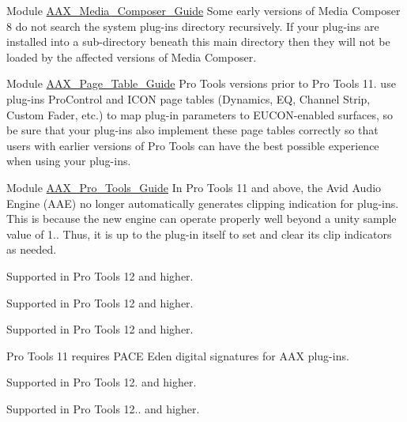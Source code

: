 \begin{DoxyRefList}
\item[Module \mbox{\hyperlink{a00847}{AAX\+\_\+\+Media\+\_\+\+Composer\+\_\+\+Guide}} ]\label{a00801__compatibility_notes000008}%
%
 Some early versions of Media Composer 8 do not search the system plug-\/ins directory recursively. If your plug-\/ins are installed into a sub-\/directory beneath this main directory then they will not be loaded by the affected versions of Media Composer. 
\item[Module \mbox{\hyperlink{a00849}{AAX\+\_\+\+Page\+\_\+\+Table\+\_\+\+Guide}} ]\label{a00801__compatibility_notes000009}%
%
 Pro Tools versions prior to Pro Tools 11. use plug-\/ins\textquotesingle{} Pro\+Control and ICON page tables (Dynamics, EQ, Channel Strip, Custom Fader, etc.) to map plug-\/in parameters to EUCON-\/enabled surfaces, so be sure that your plug-\/ins also implement these page tables correctly so that users with earlier versions of Pro Tools can have the best possible experience when using your plug-\/ins. 
\item[Module \mbox{\hyperlink{a00846}{AAX\+\_\+\+Pro\+\_\+\+Tools\+\_\+\+Guide}} ]\label{a00801__compatibility_notes000013}%
%
 In Pro Tools 11 and above, the Avid Audio Engine (AAE) no longer automatically generates clipping indication for plug-\/ins. This is because the new engine can operate properly well beyond a unity sample value of 1.. Thus, it is up to the plug-\/in itself to set and clear its clip indicators as needed.

\label{a00801__compatibility_notes000014}%
%
 Supported in Pro Tools 12 and higher.

\label{a00801__compatibility_notes000015}%
%
 Supported in Pro Tools 12 and higher.

\label{a00801__compatibility_notes000016}%
%
 Supported in Pro Tools 12 and higher.

\label{a00801__compatibility_notes000010}%
%
 Pro Tools 11 requires PACE Eden digital signatures for AAX plug-\/ins.

\label{a00801__compatibility_notes000017}%
%
 Supported in Pro Tools 12. and higher.

\label{a00801__compatibility_notes000018}%
%
 Supported in Pro Tools 12.. and higher.


\end{DoxyRefList}
